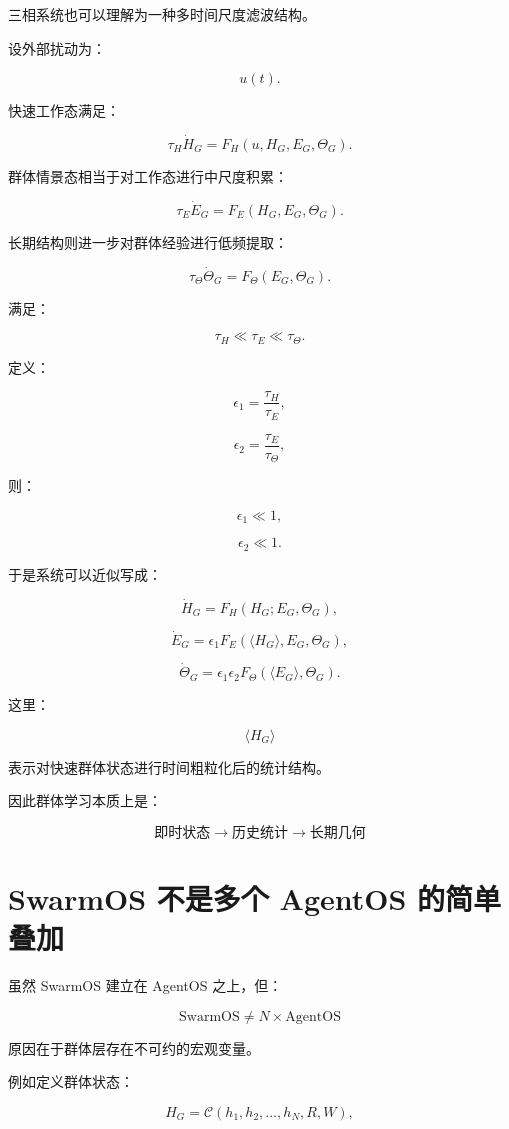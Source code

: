 三相系统也可以理解为一种多时间尺度滤波结构。

设外部扰动为：

\[
u(t).
\]

快速工作态满足：

\[
\tau_H \dot H_G
=
F_H(u,H_G,E_G,\Theta_G).
\]

群体情景态相当于对工作态进行中尺度积累：

\[
\tau_E \dot E_G
=
F_E(H_G,E_G,\Theta_G).
\]

长期结构则进一步对群体经验进行低频提取：

\[
\tau_\Theta \dot \Theta_G
=
F_\Theta(E_G,\Theta_G).
\]

满足：

\[
\tau_H
\ll
\tau_E
\ll
\tau_\Theta.
\]

定义：

\[
\epsilon_1
=
\frac{\tau_H}{\tau_E},
\]

\[
\epsilon_2
=
\frac{\tau_E}{\tau_\Theta},
\]

则：

\[
\epsilon_1
\ll
1,
\]

\[
\epsilon_2
\ll
1.
\]

于是系统可以近似写成：

\[
\dot H_G
=
F_H(H_G;E_G,\Theta_G),
\]

\[
\dot E_G
=
\epsilon_1
F_E(\langle H_G\rangle,E_G,\Theta_G),
\]

\[
\dot\Theta_G
=
\epsilon_1\epsilon_2
F_\Theta(\langle E_G\rangle,\Theta_G).
\]

这里：

\[
\langle H_G\rangle
\]

表示对快速群体状态进行时间粗粒化后的统计结构。

因此群体学习本质上是：

\[
\boxed{
\text{即时状态}
\rightarrow
\text{历史统计}
\rightarrow
\text{长期几何}
}
\]


\section{SwarmOS 不是多个 AgentOS 的简单叠加}

虽然 SwarmOS 建立在 AgentOS 之上，但：

\[
\boxed{
\mathrm{SwarmOS}
\neq
N\times\mathrm{AgentOS}
}
\]

原因在于群体层存在不可约的宏观变量。

例如定义群体状态：

\[
H_G
=
\mathcal{C}
\left(
h_1,
h_2,
\dots,
h_N,
R,
W
\right),
\]

